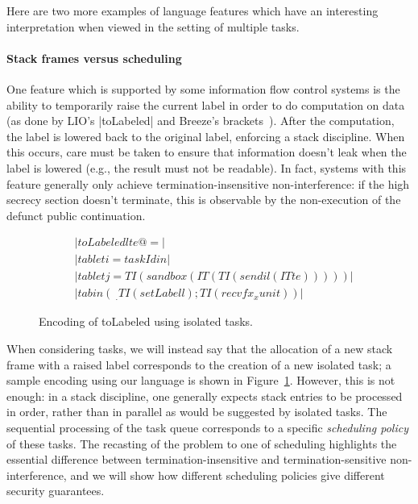 Here are two more examples of language features which have an
interesting interpretation when viewed in the setting of multiple tasks.

\paragraph{Stack frames versus scheduling}  One feature which is
supported by some information flow control systems is the ability to
temporarily raise the current label in order to do computation on data
(as done by LIO's |toLabeled| and Breeze's
brackets~\cite{Hritcu:2013:YIB:2497621.2498098,
stefan:2012:arxiv-flexible}).  After the computation, the label is lowered back to the original label,
enforcing a stack discipline.  When this occurs, care must be taken to ensure that information doesn't leak when
the label is lowered (e.g., the result must not be readable). In fact, systems with this feature generally only
achieve termination-insensitive non-interference: if the high secrecy
section doesn't terminate, this is observable by the non-execution of
the defunct public continuation.

\begin{figure}
\begin{align*}
    & |toLabeled l te @= | \\
    & |tab let i = taskId in| \\
    & |tab let j = TI (sandbox (IT (TI (send i l (IT te)))))| \\
    & |tab in (\ _ . TI (setLabel l); TI (recvf x _ x unit))|
\end{align*}
\caption{Encoding of toLabeled using isolated tasks.}\label{fig:toLabeled}
\end{figure}


When considering tasks, we will instead say that the allocation of a new
stack frame with a raised label corresponds to the creation of a new
isolated task; a sample encoding using our language is shown in
Figure~\ref{fig:toLabeled}.
However, this is not enough: in a stack discipline, one generally
expects stack entries to be processed in order, rather than in parallel
as would be suggested by isolated tasks.  The sequential processing of
the task queue corresponds to a specific \emph{scheduling policy} of
these tasks.  The recasting of the problem to one of scheduling
highlights the essential difference between termination-insensitive and
termination-sensitive non-interference, and we will show how different
scheduling policies give different security guarantees.

